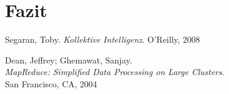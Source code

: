 \documentclass[a4paper]{llncs}
\begin{document}
\section{Fazit}

\begin{thebibliography}{------------}

  Segaran, Toby.
  {\em Kollektive Intelligenz}.
  O'Reilly, 2008

  Dean, Jeffrey; Ghemawat, Sanjay.\\
  {\em MapReduce: Simplified Data Processing on Large Clusters}.\\
  San Francisco, CA, 2004
   
\end{thebibliography}
\end{document}

